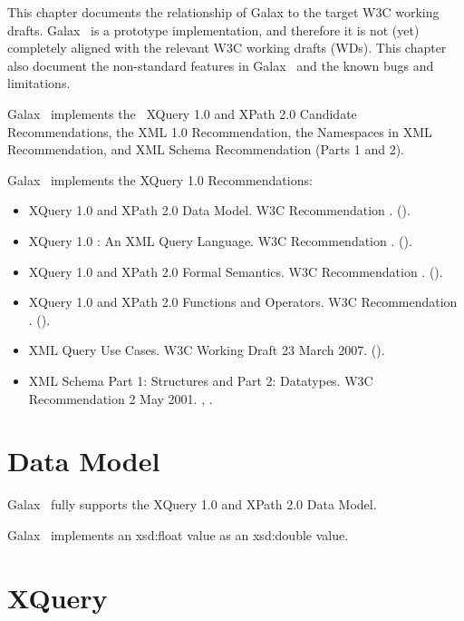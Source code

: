 This chapter documents the relationship of Galax to the target W3C
working drafts. Galax \version\ is a prototype implementation, and
therefore it is not (yet) completely aligned with the relevant W3C
working drafts (WDs).  This chapter also document the non-standard
features in Galax \version\ and the known bugs and limitations.

Galax \version\ implements the \xqueryversion\ XQuery 1.0 and XPath
2.0 Candidate Recommendations, the XML 1.0 Recommendation, the
Namespaces in XML Recommendation, and XML Schema Recommendation (Parts
1 and 2).

Galax \version\ implements the XQuery 1.0 Recommendations:
\begin{itemize}
\item XQuery 1.0 and XPath 2.0 Data Model.
      W3C Recommendation \xqueryrec.
      ().
\item XQuery 1.0 : An XML Query Language.
      W3C Recommendation \xqueryrec.
      ().
\item XQuery 1.0 and XPath 2.0 Formal Semantics.
      W3C Recommendation \xqueryrec.
      ().
\item XQuery 1.0 and XPath 2.0 Functions and Operators.
      W3C Recommendation \xqueryrec.
      ().
\item XML Query Use Cases.
      W3C Working Draft 23 March 2007.
      ().
\item XML Schema Part 1: Structures and Part 2: Datatypes.
      W3C Recommendation 2 May 2001.
      ,
      .
\end{itemize}

\section{Data Model}

Galax \version\ fully supports the XQuery 1.0 and XPath 2.0 Data Model.

Galax \version\ implements an xsd:float value as an xsd:double value.

\section{XQuery}

